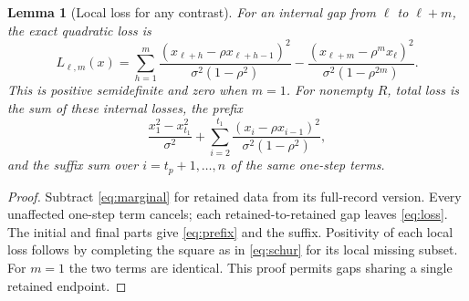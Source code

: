 \documentclass[11pt]{article}
\newtheorem{lemma}{Lemma}
\newcommand{\sig}{\sigma}
\begin{document}
\begin{lemma}[Local loss for any contrast]\label{lem:local}
For an internal gap from $\ell$ to $\ell+m$, the exact quadratic loss is
\begin{equation}\label{eq:loss}
 L_{\ell,m}(x)=
 \sum_{h=1}^m\frac{(x_{\ell+h}-\rho x_{\ell+h-1})^2}{\sig^2(1-\rho^2)}
 -\frac{(x_{\ell+m}-\rho^m x_\ell)^2}{\sig^2(1-\rho^{2m})}.
\end{equation}
This is positive semidefinite and zero when $m=1$.
For nonempty $R$, total loss is the sum of these internal losses, the prefix
\begin{equation}\label{eq:prefix}
 \frac{x_1^2-x_{t_1}^2}{\sig^2}
 +\sum_{i=2}^{t_1}\frac{(x_i-\rho x_{i-1})^2}{\sig^2(1-\rho^2)},
\end{equation}
and the suffix sum over $i=t_p+1,\ldots,n$ of the same one-step terms.
\end{lemma}
\begin{proof}
Subtract \eqref{eq:marginal} for retained data from its full-record version.
Every unaffected one-step term cancels; each retained-to-retained gap leaves
\eqref{eq:loss}. The initial and final parts give \eqref{eq:prefix} and the
suffix. Positivity of each local loss follows by completing the square as in
\eqref{eq:schur} for its local missing subset. For $m=1$ the two terms are
identical. This proof permits gaps sharing a single retained endpoint.
\end{proof}
\end{document}

